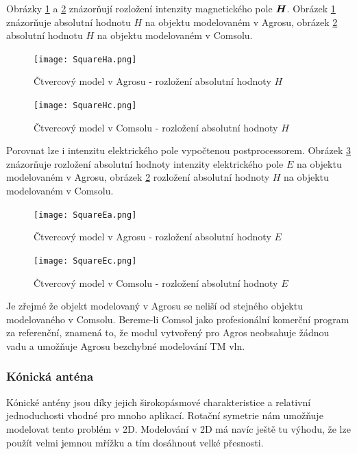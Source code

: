 \documentclass[12pt,a4paper,oneside]{article}
\numberwithin{equation}{section} %
\numberwithin{figure}{section} %
\numberwithin{table}{section} %
\renewcommand{\vec}[1]{\mbox{\boldmath$#1$}} %
\begin{document}
Obrázky \ref{SQaH} a \ref{SQcH} znázorňují rozložení intenzity magnetického pole $\vec{H}$. Obrázek \ref{SQaH} znázorňuje absolutní hodnotu $H$ na objektu modelovaném v Agrosu, obrázek \ref{SQcH} absolutní hodnotu $H$ na objektu modelovaném v Comsolu.

\begin{figure}
\begin{center}
\texttt{[image: SquareHa.png]} 
\caption{Čtvercový model v Agrosu - rozložení absolutní hodnoty $H$} 
\label{SQaH}
\end{center}
\end{figure}

\begin{figure}
\begin{center}
\texttt{[image: SquareHc.png]} 
\caption{Čtvercový model v Comsolu - rozložení absolutní hodnoty $H$} 
\label{SQcH}
\end{center}
\end{figure}

Porovnat lze i intenzitu elektrického pole vypočtenou postprocessorem. Obrázek \ref{SQaE} znázorňuje rozložení absolutní hodnoty intenzity elektrického pole $E$ na objektu modelovaném v Agrosu, obrázek \ref{SQcH} rozložení absolutní hodnoty $H$ na objektu modelovaném v Comsolu.

\begin{figure}
\begin{center}
\texttt{[image: SquareEa.png]} 
\caption{Čtvercový model v Agrosu - rozložení absolutní hodnoty $E$} 
\label{SQaE}
\end{center}
\end{figure}

\begin{figure}
\begin{center}
\texttt{[image: SquareEc.png]} 
\caption{Čtvercový model v Comsolu - rozložení absolutní hodnoty $E$} 
\label{SQcE}
\end{center}
\end{figure}

Je zřejmé že objekt modelovaný v Agrosu se neliší od stejného objektu modelovaného v Comsolu. Bereme-li Comsol jako profesionální komerční program za referenční, znamená to, že modul vytvořený pro Agros neobsahuje žádnou vadu a umožňuje Agrosu bezchybné modelování TM vln.




\subsubsection{Kónická anténa}
\label{antena}
Kónické antény jsou díky jejich širokopásmové charakteristice a relativní jednoduchosti vhodné pro mnoho aplikací. Rotační symetrie nám umožňuje modelovat tento problém v 2D. Modelování v 2D má navíc ještě tu výhodu, že lze použít velmi jemnou mřížku a tím dosáhnout velké přesnosti.
\end{document}
